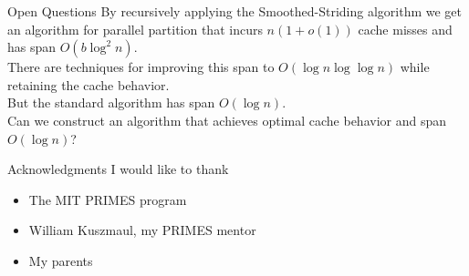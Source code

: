 \documentclass[xcolor=x11names, svgnames, rgb]{beamer}
\newcommand{\polylog}{\operatorname{polylog}}
\begin{document}





\begin{frame}[t]{Open Questions}
	By recursively applying the Smoothed-Striding algorithm we get an algorithm for
	parallel partition that incurs $n(1+o(1))$ cache misses and has span
	$O(b\log^2 n)$.\\
	\vspace{0.25cm}
	There are techniques for improving this span to $O(\log n\log\log n)$ while retaining the cache behavior.\\
	\vspace{0.25cm}
	But the standard algorithm has span $O(\log n)$.\\
	\vspace{1cm}
	Can we construct an algorithm that achieves optimal cache behavior and span $O(\log n)$?
\end{frame}

\begin{frame}[t]{Acknowledgments}
I would like to thank
\begin{itemize}
	\item {The MIT PRIMES program}
	\item {William Kuszmaul, my PRIMES mentor}
	\item {My parents}
\end{itemize}
\end{frame}
\end{document}
